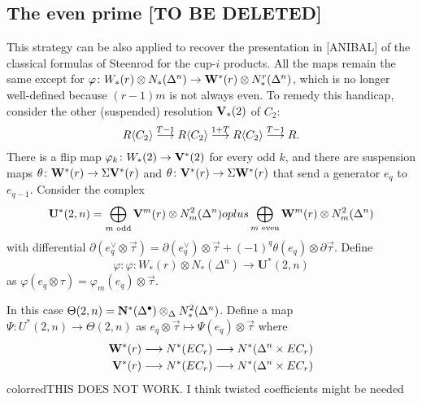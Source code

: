 \subsection{The even prime [TO BE DELETED]} This strategy can be also applied to recover the presentation in [ANIBAL] of the classical formulas of Steenrod for the cup-$i$ products. All the maps remain the same except for $\varphi\colon W_*(r)\otimes N_*(\Delta^n)\to \mathbf{W}^*(r)\otimes N^r_*(\Delta^n)$, which is no longer well-defined because $(r-1)m$ is not always even. To remedy this handicap, consider the other (suspended) resolution $\mathbf{V}_*(2)$ of $C_2$:
\[R\langle C_2\rangle \overset{T-1}{\longrightarrow} R\langle C_2\rangle \overset{1+T}{\longrightarrow} R\langle C_2\rangle \overset{T-1}{\longrightarrow} R.\]
There is a flip map $\varphi_k\colon W_*(2)\to \mathbf{V}^*(2)$ for every odd $k$, and there are suspension maps $\theta\colon \mathbf{W}^*(r)\to \Sigma \mathbf{V}^*(r)$ and $\theta\colon \mathbf{V}^*(r)\to \Sigma \mathbf{W}^*(r)$ that send a generator $e_q$ to $e_{q-1}$. Consider the complex
\[\mathbf{U}^*(2,n) = \bigoplus_{m\text{ odd}} \mathbf{V}^m(r)\otimes N^2_m(\Delta^n)
oplus
\bigoplus_{m\text{ even}} \mathbf{W}^m(r)\otimes N^2_m(\Delta^n)
\]
with differential $\partial(e_q^\vee\otimes \vec{\tau}) = \partial(e_q^\vee)\otimes \vec{\tau} + (-1)^q \theta(e_q)\otimes \partial \vec{\tau}$. Define
\[\varphi\colon \varphi\colon W_*(r)\otimes N_*(\Delta^n)\to 
\mathbf{U}^*(2,n)\]
as $\varphi(e_q\otimes \tau) = \varphi_m(e_q)\otimes \vec{\tau}$.

In this case $\Theta(2,n) = \mathbf{N}^*(\Delta^\bullet)\otimes_{\Delta} N_*^2(\Delta^n)$. Define a map $\Psi\colon U^*(2,n)\to \Theta(2,n)$ as $e_q\otimes \vec{\tau}\mapsto \Psi(e_q)\otimes \vec{\tau}$ where 
\begin{align*}
    \mathbf{W}^*(r)\longrightarrow N^*(EC_r) \longrightarrow N^*(\Delta^n\times EC_r) \\
    \mathbf{V}^*(r)\longrightarrow N^*(EC_r) \longrightarrow N^*(\Delta^n\times EC_r) \\
\end{align*}
{color{red}THIS DOES NOT WORK. I think twisted coefficients might be needed}
